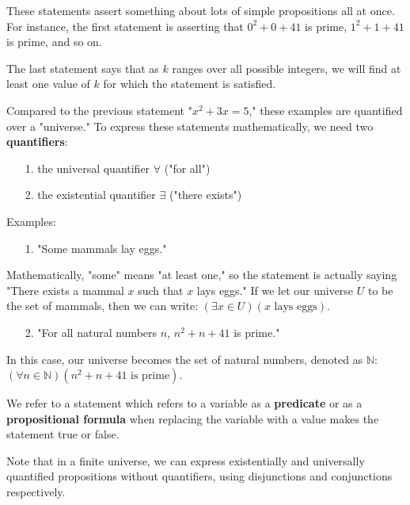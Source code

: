 \documentclass[12pt,a4paper]{article}
\begin{document}
These statements assert something about lots of simple propositions all at once. For instance, the first statement is asserting that $0^2+0+41$ is prime, $1^2+1+41$ is prime, and so on.

\bigbreak

The last statement says that as $k$ ranges over all possible integers, we will find at least one value of $k$ for which the statement is satisfied.

\bigbreak

Compared to the previous statement "$x^2+3x=5$," these examples are quantified over a "universe." To express these statements mathematically, we need two \textbf{quantifiers}:
\begin{itemize}
	\item[1.] the universal quantifier $\forall$ ("for all")
	\item[2.] the existential quantifier $\exists$ ("there exists")
\end{itemize}

Examples:
\begin{itemize}
	\item[1.] "Some mammals lay eggs."
\end{itemize}

Mathematically, "some" means "at least one," so the statement is actually saying "There exists a mammal $x$ such that $x$ lays eggs." If we let our universe $U$ to be the set of mammals, then we can write: $(\exists x\in U)(x \text{ lays eggs})$.

\begin{itemize}
	\item[2.] "For all natural numbers $n$, $n^2+n+41$ is prime."
\end{itemize}

In this case, our universe becomes the set of natural numbers, denoted as $\mathbb{N}$: $(\forall n \in \mathbb{N})(n^2+n+41\text{ is prime})$.

\bigbreak

We refer to a statement which refers to a variable as a \textbf{predicate} or as a \textbf{propositional formula} when replacing the variable with a value makes the statement true or false.

\newpage

Note that in a finite universe, we can express existentially and universally quantified propositions without quantifiers, using disjunctions and conjunctions respectively.

\bigbreak
\end{document}
